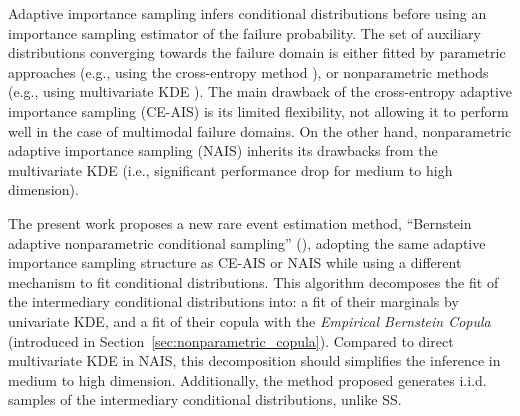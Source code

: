 Adaptive importance sampling infers conditional distributions before using an importance sampling estimator of the failure probability. 
The set of auxiliary distributions converging towards the failure domain is either fitted by parametric approaches (e.g., using the cross-entropy method \citealp{rubinstein_2004_CE}), or nonparametric methods (e.g., using multivariate KDE \citealp{zhang_1996_NIS, Morio_RESS_2011}). 
The main drawback of the cross-entropy adaptive importance sampling (CE-AIS) is its limited flexibility, not allowing it to perform well in the case of multimodal failure domains. 
On the other hand, nonparametric adaptive importance sampling (NAIS) inherits its drawbacks from the multivariate KDE (i.e., significant performance drop for medium to high dimension). 


The present work proposes a new rare event estimation method, ``Bernstein adaptive nonparametric conditional sampling'' (), adopting the same adaptive importance sampling structure as CE-AIS or NAIS while using a different mechanism to fit conditional distributions. 
This algorithm decomposes the fit of the intermediary conditional distributions into: a fit of their marginals by univariate KDE, and a fit of their copula with the \emph{Empirical Bernstein Copula} (introduced in Section~\ref{sec:nonparametric_copula}). 
Compared to direct multivariate KDE in NAIS, this decomposition should simplifies the inference in medium to high dimension. 
Additionally, the method proposed generates i.i.d. samples of the intermediary conditional distributions, unlike SS. 

